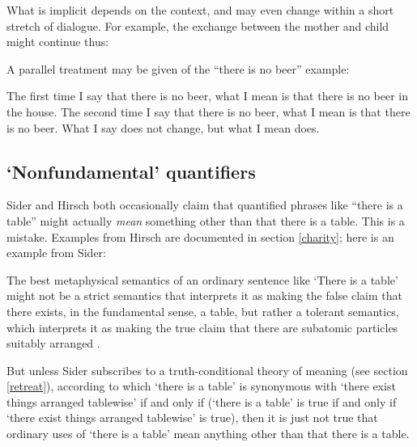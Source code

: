 \documentclass[11pt]{article}
\newenvironment{squote}{%
\begin{spacing}{1}
       	\begin{list}{}{%
\setlength{\labelwidth}{0pt}%
\rightmargin\leftmargin%
}
\item\relax
}{%
\end{list}%
\end{spacing}
}
\begin{document}
\begin{spacing}{1.25}
\noindent What is implicit depends on the context, and may even change
within a short stretch of dialogue.  For example, the exchange between
the mother and child might continue thus:




A parallel treatment may be given of the ``there is no beer'' example:




The first time I say that there is no beer, what I mean is that there
is no beer in the house.  The second time I say that there is no beer,
what I mean is that there is no beer.  What I say does not change, but
what I mean does.

\subsection{`Nonfundamental' quantifiers}
\label{fun-quant}
Sider and Hirsch both occasionally claim that quantified phrases like
``there is a table'' might actually {\em mean} something other than
that there is a table.  This is a mistake.  Examples from Hirsch are
documented in section \ref{charity}; here is an example from Sider:

\begin{squote}
The best metaphysical semantics of an ordinary sentence like `There is
a table' might not be a strict semantics that interprets it as making
the false claim that there exists, in the fundamental sense, a table,
but rather a tolerant semantics, which interprets it as making the
true claim that there are subatomic particles suitably arranged
\citeyearpar[171]{sider2011d}.
\end{squote}

But unless Sider subscribes to a truth-conditional theory of meaning
(see section \ref{retreat}), according to which `there is a table' is
synonymous with `there exist things arranged tablewise' if and only if
(`there is a table' is true if and only if `there exist things
arranged tablewise' is true), then it is just not true that ordinary
uses of `there is a table' mean anything other than that there is a
table.


\end{spacing}
\end{document}
